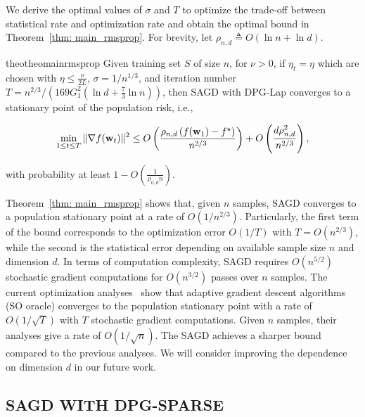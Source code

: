 \documentclass[11pt]{article}
\begin{document}
We derive the optimal values of $\sigma$ and $T$ to optimize the trade-off between statistical rate and optimization rate and obtain the optimal bound in Theorem~\ref{thm: main_rmsprop}. For brevity, let $\rho_{n,d} \triangleq O \left(\ln n + \ln d\right)$.


\begin{restatable}{theo}{theomainrmsprop}
\label{thm: main_rmsprop}
 Given training set $S$ of size $n$, for $\nu >0$, if $\eta_t = \eta$ which are chosen with $\eta \leq \frac{\nu}{2L}$,  $\sigma = 1/n^{1/3}$, and iteration number $T = n^{2/3}/\left(169G_1^2(\ln d + \frac{7}{3}\ln n)\right)$, then SAGD with DPG-Lap converges to a stationary point of the population risk, i.e., 
 \begin{small}
\begin{equation*}
 \min_{1\leq t \leq T}\|\nabla f(\mathbf{w}_t)\|^2 \leq
 O \left( \frac{\rho_{n,d} \left(f(\mathbf{w}_1) - f^\star \right)}{n^{2/3}} \right) + O \left( \frac{d \rho_{n,d}^2}{n^{2/3}}\right),
\end{equation*}
\end{small}
with probability at least $1-O\left(\frac{1}{\rho_{n,d} n}\right)$.
\end{restatable} 


Theorem~\ref{thm: main_rmsprop} shows that, given $n$ samples, SAGD converges to a population stationary point at a rate of $O(1/n^{2/3})$. Particularly, the first term of the bound corresponds to the optimization error $O(1/T)$ with $T = O(n^{2/3})$, while the second is the statistical error depending on available sample size $n$ and dimension $d$. In terms of computation complexity, SAGD 
requires $O(n^{5/2})$ stochastic gradient computations for $O(n^{3/2})$ passes over $n$ samples. The current optimization analyses~\citep{zare18, wawu19, zosh2019, cheli2019} show that 
adaptive gradient descent algorithms (SO oracle) converges to the population stationary point with a rate of $O(1/\sqrt{T})$ with $T$ stochastic gradient computations. Given $n$ samples, their analyses give a rate of  $O(1/\sqrt{n})$. The SAGD achieves a sharper bound compared to the previous analyses.  
We will consider improving the dependence on dimension $d$ in our future work.



\vspace{-0.05in}
\subsection{SAGD WITH DPG-SPARSE} \label{subsec: sagd-sparse}
\end{document}

